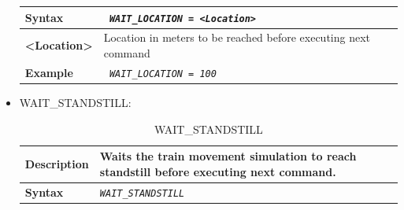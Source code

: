 \begin{itemize}
\begin{longtable}{|l|l|}
			\hline

				\begin{minipage}[t]{0.22\linewidth} \textbf{Syntax}	\end{minipage}
			&	\begin{minipage}[t]{0.78\linewidth} \emph{\texttt{ WAIT\_LOCATION = <Location>}} \end{minipage} \\

			\hline

				\begin{minipage}[t]{0.22\linewidth} \textbf{<Location>} \end{minipage}
			&	\begin{minipage}[t]{0.78\linewidth} Location in meters to be reached before executing next command \end{minipage} \\

			\hline

				\begin{minipage}[t]{0.22\linewidth} \textbf{Example} \end{minipage}
			&	\begin{minipage}[t]{0.78\linewidth} \emph{\texttt{ WAIT\_LOCATION = 100 }} \end{minipage} \\

			\hline\hline

		\end{longtable}

	\item WAIT\_STANDSTILL:

		\begin{longtable}{|l|l|}
			\caption{WAIT\_STANDSTILL}\\
			\hline

				\begin{minipage}[t]{0.22\linewidth} \textbf{Description} \end{minipage}
			&	\begin{minipage}[t]{0.78\linewidth} Waits the train movement simulation to reach standstill before executing next command. \end{minipage} \\

			\hline

				\begin{minipage}[t]{0.22\linewidth} \textbf{Syntax}	\end{minipage}
			&	\begin{minipage}[t]{0.78\linewidth} \emph{\texttt{WAIT\_STANDSTILL}} \end{minipage} \\


\end{longtable}
\end{itemize}
